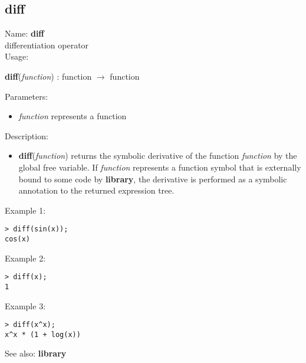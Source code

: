 \subsection{ diff }
\noindent Name: \textbf{diff}\\
differentiation operator\\

\noindent Usage: 
\begin{center}
\textbf{diff}(\emph{function}) : \textsf{function} $\rightarrow$ \textsf{function}\\
\end{center}
Parameters: 
\begin{itemize}
\item \emph{function} represents a function
\end{itemize}
\noindent Description: \begin{itemize}

\item \textbf{diff}(\emph{function}) returns the symbolic derivative of the function
   \emph{function} by the global free variable.
   If \emph{function} represents a function symbol that is externally bound
   to some code by \textbf{library}, the derivative is performed as a symbolic
   annotation to the returned expression tree.
\end{itemize}
\noindent Example 1: 
\begin{center}\begin{minipage}{15cm}\begin{Verbatim}[frame=single]
> diff(sin(x));
cos(x)
\end{Verbatim}
\end{minipage}\end{center}
\noindent Example 2: 
\begin{center}\begin{minipage}{15cm}\begin{Verbatim}[frame=single]
> diff(x);
1
\end{Verbatim}
\end{minipage}\end{center}
\noindent Example 3: 
\begin{center}\begin{minipage}{15cm}\begin{Verbatim}[frame=single]
> diff(x^x);
x^x * (1 + log(x))
\end{Verbatim}
\end{minipage}\end{center}
See also: \textbf{library}
